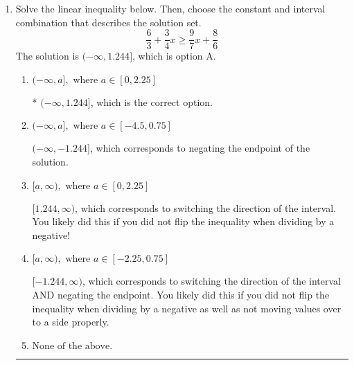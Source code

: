 \documentclass{extbook}[14pt]
\newcommand{\litem}[1]{\item #1

\rule{\textwidth}{0.4pt}}
\begin{document}
\begin{enumerate}
{\begin{enumerate}[label=\Alph*.]
* $(1.67, 9.00]$, which is the correct option.
\item \( (-\infty, a] \cup (b, \infty), \text{ where } a \in [-0.75, 2.25] \text{ and } b \in [6, 12.75] \)

$(-\infty, 1.67] \cup (9.00, \infty)$, which corresponds to displaying the and-inequality as an or-inequality AND flipping the inequality.
\item \( (-\infty, a) \cup [b, \infty), \text{ where } a \in [0, 6] \text{ and } b \in [6, 11.25] \)

$(-\infty, 1.67) \cup [9.00, \infty)$, which corresponds to displaying the and-inequality as an or-inequality.
\item \( [a, b), \text{ where } a \in [0, 4.5] \text{ and } b \in [8.25, 12] \)

$[1.67, 9.00)$, which corresponds to flipping the inequality.
\item \( \text{None of the above.} \)


\end{enumerate}

\textbf{General Comment:} To solve, you will need to break up the compound inequality into two inequalities. Be sure to keep track of the inequality! It may be best to draw a number line and graph your solution.
}
\litem{
Solve the linear inequality below. Then, choose the constant and interval combination that describes the solution set.
\[ \frac{6}{3} + \frac{3}{4} x \geq \frac{9}{7} x + \frac{8}{6} \]The solution is \( (-\infty, 1.244] \), which is option A.\begin{enumerate}[label=\Alph*.]
\item \( (-\infty, a], \text{ where } a \in [0, 2.25] \)

* $(-\infty, 1.244]$, which is the correct option.
\item \( (-\infty, a], \text{ where } a \in [-4.5, 0.75] \)

 $(-\infty, -1.244]$, which corresponds to negating the endpoint of the solution.
\item \( [a, \infty), \text{ where } a \in [0, 2.25] \)

 $[1.244, \infty)$, which corresponds to switching the direction of the interval. You likely did this if you did not flip the inequality when dividing by a negative!
\item \( [a, \infty), \text{ where } a \in [-2.25, 0.75] \)

 $[-1.244, \infty)$, which corresponds to switching the direction of the interval AND negating the endpoint. You likely did this if you did not flip the inequality when dividing by a negative as well as not moving values over to a side properly.
\item \( \text{None of the above}. \)


\end{enumerate}}
\end{enumerate}
\end{document}
